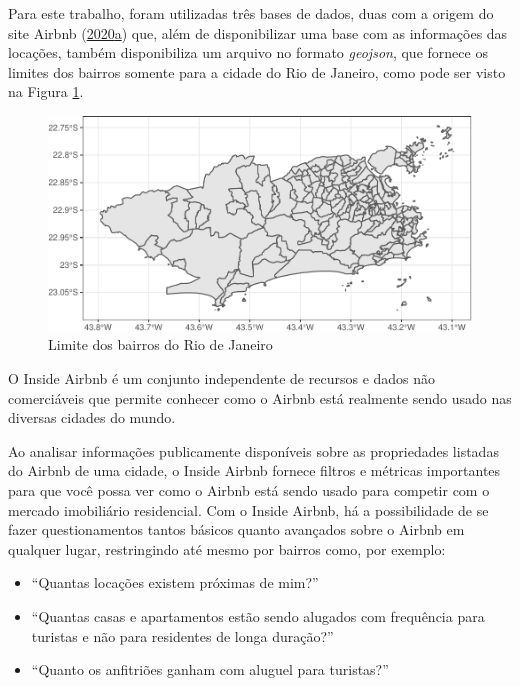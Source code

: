 \documentclass[
	12pt,				%
	a4paper,		%
	oneside,    %
	chapter=TITLE,		   %
	section=TITLE,		   %
	subsection=TITLE,	   %
	subsubsection=TITLE, %
	english,			%
	french,				%
	spanish,			%
	brazil,				%
]{abntex2}
\begin{document}
Para este trabalho, foram utilizadas três bases de dados, duas com a
origem do site Airbnb
(\protect\hyperlink{ref-inside}{2020}\protect\hyperlink{ref-inside}{a})
que, além de disponibilizar uma base com as informações das locações,
também disponibiliza um arquivo no formato \emph{geojson}, que fornece
os limites dos bairros somente para a cidade do Rio de Janeiro, como
pode ser visto na Figura \ref{mapa_bairro}.

\begin{figure}
\centering
\includegraphics{00-TCC_files/figure-latex/unnamed-chunk-7-1.pdf}
\caption{\label{mapa_bairro}Limite dos bairros do Rio de Janeiro}
\end{figure}

O Inside Airbnb é um conjunto independente de recursos e dados não
comerciáveis que permite conhecer como o Airbnb está realmente sendo
usado nas diversas cidades do mundo.

Ao analisar informações publicamente disponíveis sobre as propriedades
listadas do Airbnb de uma cidade, o Inside Airbnb fornece filtros e
métricas importantes para que você possa ver como o Airbnb está sendo
usado para competir com o mercado imobiliário residencial. Com o Inside
Airbnb, há a possibilidade de se fazer questionamentos tantos básicos
quanto avançados sobre o Airbnb em qualquer lugar, restringindo até
mesmo por bairros como, por exemplo:

\begin{itemize}
\item
  ``Quantas locações existem próximas de mim?''
\item
  ``Quantas casas e apartamentos estão sendo alugados com frequência
  para turistas e não para residentes de longa duração?''
\item
  ``Quanto os anfitriões ganham com aluguel para turistas?''
\end{itemize}
\end{document}
